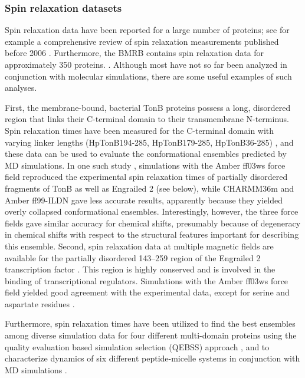 \documentclass[9pt,review]{livecoms}
\begin{document}
\subsubsection{Spin relaxation datasets}
\label{sub2:spin_relax_datasets}

Spin relaxation data have been reported for a large number of proteins; see for example a comprehensive review of spin relaxation measurements published before 2006 \cite{jarymowycz_fast_2006}.
Furthermore, the BMRB contains spin relaxation data for approximately 350 proteins.
\cite{ulrich_biomagresbank_2008,romero_biomagresbank_2020,hoch_biological_2023}.
Although most have not so far been analyzed in conjunction with molecular simulations, there are some useful examples of such analyses.

First, the membrane-bound, bacterial TonB proteins possess a long, disordered region that links their C-terminal domain to their transmembrane N-terminus.
Spin relaxation times have been measured for the C-terminal domain with varying linker lengths (HpTonB194-285, HpTonB179-285, HpTonB36-285) \cite{ciragan_nmr_2020}, and these data can be used to evaluate the conformational ensembles predicted by MD simulations.
In one such study \cite{virtanen_heterogeneous_2020}, simulations with the Amber ff03ws force field reproduced the experimental spin relaxation times of partially disordered fragments of TonB as well as Engrailed 2 (see below), while CHARMM36m and Amber ff99-ILDN gave less accurate results, apparently because they yielded overly collapsed conformational ensembles.
Interestingly, however, the three force fields gave similar accuracy for chemical shifts, presumably because of degeneracy in chemical shifts with respect to the structural features important for describing this ensemble.
Second, spin relaxation data at multiple magnetic fields are available for the partially disordered 143–259 region of the Engrailed 2 transcription factor \cite{khan_distribution_2015}.
This region is highly conserved and is involved in the binding of transcriptional regulators.
Simulations with the Amber ff03ws force field yielded good agreement with the experimental data, except for serine and aspartate residues \cite{virtanen_heterogeneous_2020}.

Furthermore, spin relaxation times have been utilized to find the best ensembles among diverse simulation data for four different multi-domain proteins using the quality evaluation based simulation selection (QEBSS) approach \cite{sandelin_qebss_2024}, and to characterize dynamics of six different peptide-micelle systems in conjunction with MD simulations \cite{nencini_probing_2024}.
\end{document}
